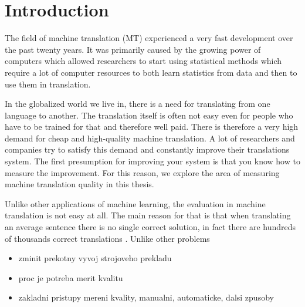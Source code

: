 \chapter{Introduction}

The field of machine translation (MT) experienced a very fast development over
the past twenty years. It was primarily caused by the growing power of
computers which allowed researchers to start using statistical methods which
require a lot of computer resources to both learn statistics from data and then
to use them in translation.

In the globalized world we live in, there is a need for translating from one
language to another. The translation itself is often not easy even for people
who have to be trained for that and therefore well paid. There is therefore a
very high demand for cheap and high-quality machine translation. A lot of
researchers and companies try to satisfy this demand and constantly improve
their translations system. The first presumption for improving your system is
that you know how to measure the improvement. For this reason, we explore the
area of measuring machine translation quality in this thesis.

Unlike other applications of machine learning, the evaluation in machine
translation is not easy at all. The main reason for that is that when
translating an average sentence there is no single correct solution, in fact
there are hundreds of thousands correct translations
. Unlike other problems




\begin{itemize}
  \item zminit prekotny vyvoj strojoveho prekladu
  \item proc je potreba merit kvalitu
  \item zakladni pristupy mereni kvality, manualni, automaticke, dalsi zpusoby 
\end{itemize}




